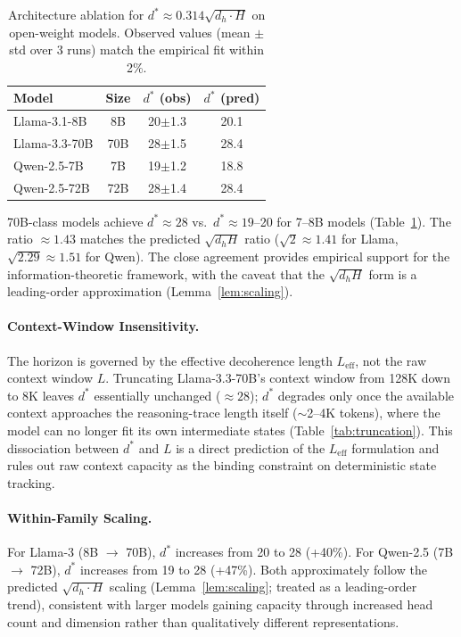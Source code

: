 \documentclass{article}
\theoremstyle{plain}
\theoremstyle{definition}
\theoremstyle{remark}
\newcommand{\Leff}{L_{\mathrm{eff}}}
\begin{document}
\begin{table}[t]
\caption{Architecture ablation for $d^* \approx 0.314\sqrt{d_h \cdot H}$ on open-weight models. Observed values (mean $\pm$ std over 3 runs) match the empirical fit within 2\%.}
\label{tab:arch_ablation}
\vskip 0.1in
\centering
\footnotesize
\begin{tabular}{@{}lccc@{}}
\toprule
\textbf{Model} & \textbf{Size} & \textbf{$d^*$ (obs)} & \textbf{$d^*$ (pred)} \\
\midrule
Llama-3.1-8B & 8B & 20$\pm$1.3 & 20.1 \\
Llama-3.3-70B & 70B & 28$\pm$1.5 & 28.4 \\
Qwen-2.5-7B & 7B & 19$\pm$1.2 & 18.8 \\
Qwen-2.5-72B & 72B & 28$\pm$1.4 & 28.4 \\
\bottomrule
\end{tabular}
\vskip -0.1in
\end{table}

70B-class models achieve $d^* \approx 28$ vs.\ $d^* \approx 19$--20 for 7--8B models (Table~\ref{tab:arch_ablation}). The ratio $\approx 1.43$ matches the predicted $\sqrt{d_h H}$ ratio ($\sqrt{2} \approx 1.41$ for Llama, $\sqrt{2.29} \approx 1.51$ for Qwen). The close agreement provides empirical support for the information-theoretic framework, with the caveat that the $\sqrt{d_h H}$ form is a leading-order approximation (Lemma~\ref{lem:scaling}).

\paragraph{Context-Window Insensitivity.} The horizon is governed by the effective decoherence length $\Leff$, not the raw context window $L$. Truncating Llama-3.3-70B's context window from 128K down to 8K leaves $d^*$ essentially unchanged ($\approx 28$); $d^*$ degrades only once the available context approaches the reasoning-trace length itself ($\sim$2--4K tokens), where the model can no longer fit its own intermediate states (Table~\ref{tab:truncation}). This dissociation between $d^*$ and $L$ is a direct prediction of the $\Leff$ formulation and rules out raw context capacity as the binding constraint on deterministic state tracking.

\paragraph{Within-Family Scaling.} For Llama-3 (8B $\rightarrow$ 70B), $d^*$ increases from 20 to 28 (+40\%). For Qwen-2.5 (7B $\rightarrow$ 72B), $d^*$ increases from 19 to 28 (+47\%). Both approximately follow the predicted $\sqrt{d_h \cdot H}$ scaling (Lemma~\ref{lem:scaling}; treated as a leading-order trend), consistent with larger models gaining capacity through increased head count and dimension rather than qualitatively different representations.
\end{document}
